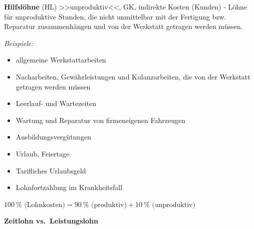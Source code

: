 \textbf{Hilfslöhne} (HL) >>unproduktiv<<, GK, indirekte Kosten (Kunden)
- Löhne für unproduktive Stunden, die nicht unmittelbar mit der
Fertigung bzw. Reparatur zusammenhängen und von der Werkstatt getragen
werden müssen.

\emph{Beispiele:}

\begin{itemize}
\item
  allgemeine Werkstattarbeiten
\item
  Nacharbeiten, Gewährleistungen und Kulanzarbeiten, die von der
  Werkstatt getragen werden müssen
\item
  Leerlauf- und Wartezeiten
\item
  Wartung und Reparatur von firmeneigenen Fahrzeugen
\item
  Ausbildungsvergütungen
\item
  Urlaub, Feiertage
\item
  Tarifliches Urlaubsgeld
\item
  Lohnfortzahlung im Krankheitsfall
\end{itemize}

$100~\% \text{ (Lohnkosten)} = 90~\% \text{ (produktiv)} + 10~\% \text{ (unproduktiv)}$

\newpage

\textbf{Zeitlohn vs.~Leistungslohn}

